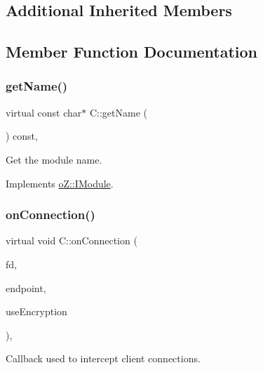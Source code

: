 \subsection*{Additional Inherited Members}


\subsection{Member Function Documentation}
\mbox{\label{class_c_ad5f4b90909e9c14fc2601adc54ffdfa6}} 
\subsubsection{\texorpdfstring{getName()}{getName()}}
{\footnotesize\ttfamily virtual const char$\ast$ C\+::get\+Name (\begin{DoxyParamCaption}\item[{void}]{ }\end{DoxyParamCaption}) const\hspace{0.3cm}{\ttfamily [inline]}, {\ttfamily [virtual]}}



Get the module name. 



Implements \mbox{\hyperlink{classo_z_1_1_i_module_af41d45158fd28e1bd86a34e25f5282d6}{o\+Z\+::\+I\+Module}}.

\mbox{\label{class_c_a9d2de0b00320ee2011d7e326346d00cb}} 
\subsubsection{\texorpdfstring{onConnection()}{onConnection()}}
{\footnotesize\ttfamily virtual void C\+::on\+Connection (\begin{DoxyParamCaption}\item[{const File\+Descriptor}]{fd,  }\item[{const}]{endpoint,  }\item[{const bool}]{use\+Encryption }\end{DoxyParamCaption})\hspace{0.3cm}{\ttfamily [inline]}, {\ttfamily [virtual]}}



Callback used to intercept client connections. 



